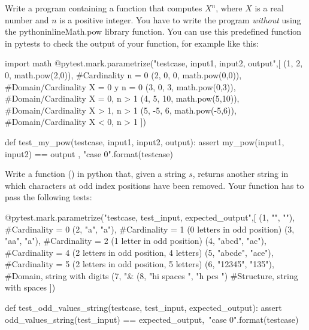 \begin{exercise}
Write a program containing a function  that computes $X^{n}$, where $X$ is a real number and $n$ is a positive integer. You have to write the program \textit{without} using the pythoninline{Math.pow} library function. You can use this predefined function in pytests to check the output of your function, for example like this:

\begin{python}
import math
@pytest.mark.parametrize("testcase, input1, input2, output",[
    (1, 2, 0, math.pow(2,0)),      #Cardinality n = 0
    (2, 0, 0, math.pow(0,0)),      #Domain/Cardinality X = 0 y n = 0
    (3, 0, 3, math.pow(0,3)),      #Domain/Cardinality X = 0, n > 1
    (4, 5, 10, math.pow(5,10)),    #Domain/Cardinality X > 1, n > 1
    (5, -5, 6, math.pow(-5,6)),    #Domain/Cardinality X < 0, n > 1
])

def test_my_pow(testcase, input1, input2, output):
    assert my_pow(input1, input2) == output , "case {0}".format(testcase)
\end{python}
\end{exercise}


\begin{exercise}
Write a function () in python that, given a string $s$, returns another string in which characters at odd index positions have been removed. Your function has to pass the following tests:

\begin{small}
\begin{python}
@pytest.mark.parametrize("testcase, test_input, expected_output",[
(1, "", ""),                #Cardinality = 0
(2, "a", "a"),              #Cardinality = 1 (0 letters in odd position)
(3, "aa", "a"),             #Cardinality = 2 (1 letter in odd position)
(4, "abcd", "ac"),          #Cardinality = 4 (2 letters in odd position, 4 letters)
(5, "abcde", "ace"),        #Cardinality = 5 (2 letters in odd position, 5 letters)
(6, "12345", "135"),                    #Domain, string with digits
(7, "&%
(8, "hi spaces  ", "h pcs ")            #Structure, string with spaces
])

def test_odd_values_string(testcase, test_input, expected_output):
    assert odd_values_string(test_input) == expected_output,\
           "case {0}".format(testcase)
\end{python}
\end{small}

\end{exercise}

